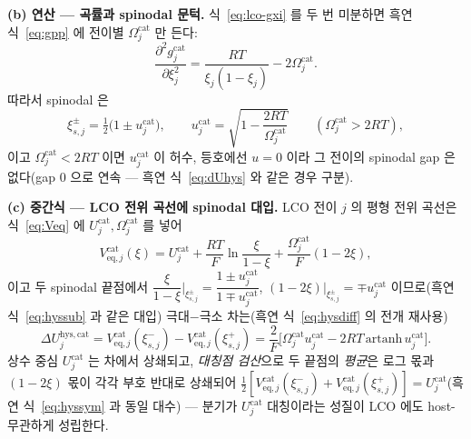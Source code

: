\documentclass[11pt,a4paper]{article}
\newcommand{\eq}{\mathrm{eq}}
\newcommand{\hys}{\mathrm{hys}}
\begin{document}
\textbf{(b) 연산 — 곡률과 spinodal 문턱.}
식~\eqref{eq:lco-gxi} 를 두 번 미분하면 흑연 식~\eqref{eq:gpp} 에 전이별 $\Omega_j^\mathrm{cat}$ 만 든다:
\begin{equation}
\frac{\partial^2 g_j^\mathrm{cat}}{\partial\xi_j^2}=\frac{RT}{\xi_j(1-\xi_j)}-2\Omega_j^\mathrm{cat}.
\label{eq:lco-gpp}
\end{equation}
따라서 spinodal 은
\begin{equation}
\xi_{s,j}^{\pm}=\tfrac12\big(1\pm u_j^\mathrm{cat}\big),\qquad
u_j^\mathrm{cat}=\sqrt{1-\frac{2RT}{\Omega_j^\mathrm{cat}}}\qquad(\Omega_j^\mathrm{cat}>2RT),
\label{eq:lco-spinodal}
\end{equation}
이고 $\Omega_j^\mathrm{cat}<2RT$ 이면 $u_j^\mathrm{cat}$ 이 허수, 등호에선 $u=0$ 이라 그 전이의 spinodal gap 은 없다(gap $0$ 으로 연속 —
흑연 식~\eqref{eq:dUhys} 와 같은 경우 구분).

\textbf{(c) 중간식 — LCO 전위 곡선에 spinodal 대입.}
LCO 전이 $j$ 의 평형 전위 곡선은 식~\eqref{eq:Veq} 에 $U_j^\mathrm{cat},\Omega_j^\mathrm{cat}$ 를 넣어
\begin{equation}
V_{\eq,j}^\mathrm{cat}(\xi)=U_j^\mathrm{cat}
+\frac{RT}{F}\ln\frac{\xi}{1-\xi}+\frac{\Omega_j^\mathrm{cat}}{F}(1-2\xi),
\label{eq:lco-Veq}
\end{equation}
이고 두 spinodal 끝점에서 $\dfrac{\xi}{1-\xi}\Big|_{\xi_{s,j}^\pm}=\dfrac{1\pm u_j^\mathrm{cat}}{1\mp
u_j^\mathrm{cat}}$, $(1-2\xi)\big|_{\xi_{s,j}^\pm}=\mp u_j^\mathrm{cat}$ 이므로(흑연 식~\eqref{eq:hyssub}
과 같은 대입) 극대$-$극소 차는(흑연 식~\eqref{eq:hysdiff} 의 전개 재사용)
\[
\Delta U_{j}^{\hys,\mathrm{cat}}=V_{\eq,j}^\mathrm{cat}(\xi_{s,j}^-)-V_{\eq,j}^\mathrm{cat}(\xi_{s,j}^+)
=\frac{2}{F}\big[\Omega_j^\mathrm{cat}u_j^\mathrm{cat}-2RT\,\mathrm{artanh}\,u_j^\mathrm{cat}\big].
\]
상수 중심 $U_j^\mathrm{cat}$ 는 차에서 상쇄되고, \emph{대칭점 검산}으로 두 끝점의 \emph{평균}은 로그 몫과
$(1-2\xi)$ 몫이 각각 부호 반대로 상쇄되어 $\tfrac12[V_{\eq,j}^\mathrm{cat}(\xi_{s,j}^-)
+V_{\eq,j}^\mathrm{cat}(\xi_{s,j}^+)]=U_j^\mathrm{cat}$(흑연 식~\eqref{eq:hyssym} 과 동일 대수) —
분기가 $U_j^\mathrm{cat}$ 대칭이라는 성질이 LCO 에도 host-무관하게 성립한다.
\end{document}
